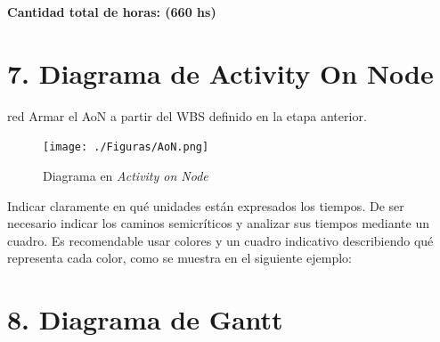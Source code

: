 \documentclass[11pt]{charter}
\begin{document}
\textbf{Cantidad total de horas: (660 hs)}


\section{7. Diagrama de Activity On Node}
\label{sec:AoN}

\begin{consigna}{red}
Armar el AoN a partir del WBS definido en la etapa anterior. 



\end{consigna}

\begin{figure}[htpb]
\centering 
\texttt{[image: ./Figuras/AoN.png]}
\caption{Diagrama en \textit{Activity on Node}}
\label{fig:AoN}
\end{figure}

Indicar claramente en qué unidades están expresados los tiempos.
De ser necesario indicar los caminos semicríticos y analizar sus tiempos mediante un cuadro.
Es recomendable usar colores y un cuadro indicativo describiendo qué representa cada color, como se muestra en el siguiente ejemplo:



\section{8. Diagrama de Gantt}
\label{sec:gantt}
\end{document}
